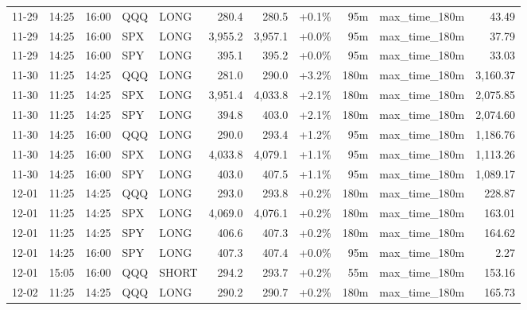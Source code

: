 \documentclass[11pt,a4paper,twoside]{article}
\begin{document}
\begin{center}
\begin{longtable}{>{\color{txtmain}}l l l l l r r r r >{\color{txtmain}}l r}
11-29 & 14:25 & 16:00 & QQQ & LONG & 280.4 & 280.5 & \textcolor{wingreen}{+0.1\%} & 95m & max\_time\_180m & \textcolor{wingreen}{43.49} \\
11-29 & 14:25 & 16:00 & SPX & LONG & 3,955.2 & 3,957.1 & \textcolor{wingreen}{+0.0\%} & 95m & max\_time\_180m & \textcolor{wingreen}{37.79} \\
11-29 & 14:25 & 16:00 & SPY & LONG & 395.1 & 395.2 & \textcolor{wingreen}{+0.0\%} & 95m & max\_time\_180m & \textcolor{wingreen}{33.03} \\
11-30 & 11:25 & 14:25 & QQQ & LONG & 281.0 & 290.0 & \textcolor{wingreen}{+3.2\%} & 180m & max\_time\_180m & \textcolor{wingreen}{3,160.37} \\
11-30 & 11:25 & 14:25 & SPX & LONG & 3,951.4 & 4,033.8 & \textcolor{wingreen}{+2.1\%} & 180m & max\_time\_180m & \textcolor{wingreen}{2,075.85} \\
11-30 & 11:25 & 14:25 & SPY & LONG & 394.8 & 403.0 & \textcolor{wingreen}{+2.1\%} & 180m & max\_time\_180m & \textcolor{wingreen}{2,074.60} \\
11-30 & 14:25 & 16:00 & QQQ & LONG & 290.0 & 293.4 & \textcolor{wingreen}{+1.2\%} & 95m & max\_time\_180m & \textcolor{wingreen}{1,186.76} \\
11-30 & 14:25 & 16:00 & SPX & LONG & 4,033.8 & 4,079.1 & \textcolor{wingreen}{+1.1\%} & 95m & max\_time\_180m & \textcolor{wingreen}{1,113.26} \\
11-30 & 14:25 & 16:00 & SPY & LONG & 403.0 & 407.5 & \textcolor{wingreen}{+1.1\%} & 95m & max\_time\_180m & \textcolor{wingreen}{1,089.17} \\
12-01 & 11:25 & 14:25 & QQQ & LONG & 293.0 & 293.8 & \textcolor{wingreen}{+0.2\%} & 180m & max\_time\_180m & \textcolor{wingreen}{228.87} \\
12-01 & 11:25 & 14:25 & SPX & LONG & 4,069.0 & 4,076.1 & \textcolor{wingreen}{+0.2\%} & 180m & max\_time\_180m & \textcolor{wingreen}{163.01} \\
12-01 & 11:25 & 14:25 & SPY & LONG & 406.6 & 407.3 & \textcolor{wingreen}{+0.2\%} & 180m & max\_time\_180m & \textcolor{wingreen}{164.62} \\
12-01 & 14:25 & 16:00 & SPY & LONG & 407.3 & 407.4 & \textcolor{wingreen}{+0.0\%} & 95m & max\_time\_180m & \textcolor{wingreen}{2.27} \\
12-01 & 15:05 & 16:00 & QQQ & SHORT & 294.2 & 293.7 & \textcolor{wingreen}{+0.2\%} & 55m & max\_time\_180m & \textcolor{wingreen}{153.16} \\
12-02 & 11:25 & 14:25 & QQQ & LONG & 290.2 & 290.7 & \textcolor{wingreen}{+0.2\%} & 180m & max\_time\_180m & \textcolor{wingreen}{165.73} \\

\end{longtable}
\end{center}
\end{document}
